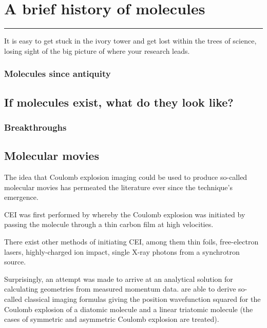 \chapter{A brief history of molecules}\label{ch:history}

\vspace{-1.5 em}
\minitoc\hrule
\vspace{1.5 em}

It is easy to get stuck in the ivory tower and get lost within the trees of science, losing sight of the big picture of where your research leads.

\subsection{Molecules since antiquity}

\section{If molecules exist, what do they look like?}
\subsection{Breakthroughs}

\section{Molecular movies}

The idea that Coulomb explosion imaging could be used to produce so-called molecular movies has permeated the literature ever since the technique's emergence.

CEI was first performed by \citet{Vager89} whereby the Coulomb explosion was initiated by passing the molecule through a thin carbon film at high velocities.

There exist other methods of initiating CEI, among them thin foils, free-electron lasers, highly-charged ion impact, single X-ray photons from a synchrotron source.

Surprisingly, an attempt was made to arrive at an analytical solution for calculating geometries from measured momentum data. \citet{Nagaya04}  are able to derive so-called classical imaging formulas giving the position wavefunction squared for the Coulomb explosion of a diatomic molecule and a linear triatomic molecule (the cases of symmetric and asymmetric Coulomb explosion are treated).

